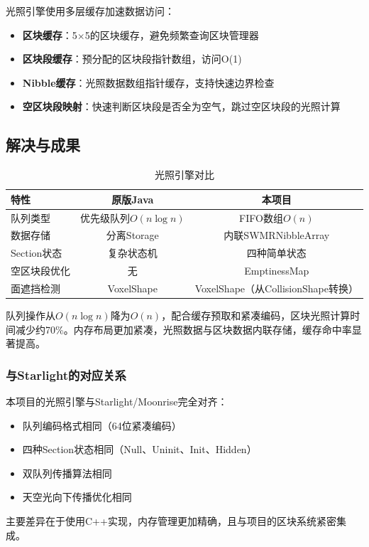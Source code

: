 光照引擎使用多层缓存加速数据访问：

\begin{itemize}
    \item \textbf{区块缓存}：5$\times$5的区块缓存，避免频繁查询区块管理器
    \item \textbf{区块段缓存}：预分配的区块段指针数组，访问O(1)
    \item \textbf{Nibble缓存}：光照数据数组指针缓存，支持快速边界检查
    \item \textbf{空区块段映射}：快速判断区块段是否全为空气，跳过空区块段的光照计算
\end{itemize}

\subsection{解决与成果}

\begin{table}[h]
\centering
\caption{光照引擎对比}
\label{tab:lighting_comparison}
\begin{tabular}{lcc}
\toprule
\textbf{特性} & \textbf{原版Java} & \textbf{本项目} \\
\midrule
队列类型 & 优先级队列$O(n\log n)$ & FIFO数组$O(n)$ \\
数据存储 & 分离Storage & 内联SWMRNibbleArray \\
Section状态 & 复杂状态机 & 四种简单状态 \\
空区块段优化 & 无 & EmptinessMap \\
面遮挡检测 & VoxelShape & VoxelShape（从CollisionShape转换） \\
\bottomrule
\end{tabular}
\end{table}

队列操作从$O(n \log n)$降为$O(n)$，配合缓存预取和紧凑编码，区块光照计算时间减少约70\%。内存布局更加紧凑，光照数据与区块数据内联存储，缓存命中率显著提高。

\subsubsection{与Starlight的对应关系}

本项目的光照引擎与Starlight/Moonrise完全对齐：

\begin{itemize}
    \item 队列编码格式相同（64位紧凑编码）
    \item 四种Section状态相同（Null、Uninit、Init、Hidden）
    \item 双队列传播算法相同
    \item 天空光向下传播优化相同
\end{itemize}

主要差异在于使用C++实现，内存管理更加精确，且与项目的区块系统紧密集成。
